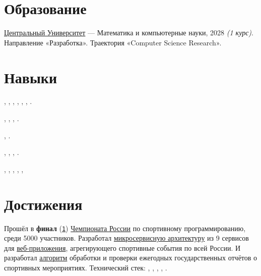 \documentclass[margin,line]{resume}
\begin{document}
\begin{resume}
  \section{\mysidestyle Образование}
  \href{https://centraluniversity.ru/}{Центральный Университет} —
  Математика и компьютерные науки, 2028 \textit{(1 курс)}.
  Направление «Разработка». Траектория «Computer Science Research».

  \section{\mysidestyle Навыки}

  \vspace{0.4mm}
  \begin{description}[leftmargin=0pt, itemindent=*, itemsep=0.2pt]
    \item[Python:] \hangindent=9mm 
      , ,
      ,
      , ,
      , .
    \item[Databases:] , ,
      , .
    \item[Message brokers:] , .
    \item[Other technologies:] , ,
      , .
    \item[Dev tools:] , ,
      , , ,
  \end{description}

  \section{\mysidestyle Достижения}
  Прошёл в
  \textbf{финал}
  (\href{https://alchemmist.github.io/CV/attachments/russian-chemp-final.pdf}{\texttt{1}})
  \href{https://events.fsp-russia.com/championship}{Чемпионата
  России} по спортивному
  программированию, среди 5000 участников. Разработал
  \href{https://alchemmist.github.io/CV/attachments/architect.pdf}{микросервисную
  архитектуру} из 9 сервисов для
  \href{https://github.com/alchemmist/sportprog}{веб-приложения},
  агрегирующего спортивные события по
  всей России. И разработал
  \href{https://github.com/alchemmist/sport-afisha/blob/main/event_parsing_service/parse_pdf.py}{алгоритм}
  обработки и проверки ежегодных
  государственных
  отчётов о спортивных мероприятиях. Технический стек:
  , ,
  ,
  ,
  .


\end{resume}
\end{document}
